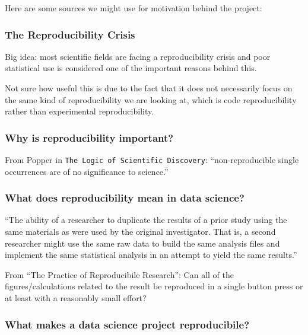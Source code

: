 \documentclass[12pt]{article}
\begin{document}
Here are some sources we might use for motivation behind the project:

\subsubsection{The Reproducibility
Crisis}\label{the-reproducibility-crisis}

Big idea: most scientific fields are facing a reproducibility crisis and
poor statistical use is considered one of the important reasons behind
this.

Not sure how useful this is due to the fact that it does not necessarily
focus on the same kind of reproducibility we are looking at, which is
code reproducibility rather than experimental reproducibility.

\citet{baker20161}

\subsubsection{Why is reproducibility
important?}\label{why-is-reproducibility-important}

From Popper in \texttt{The\ Logic\ of\ Scientific\ Discovery}:
``non-reproducible single occurrences are of no significance to
science.''

\citet{popper2005logic}

\subsubsection{What does reproducibility mean in data
science?}\label{what-does-reproducibility-mean-in-data-science}

``The ability of a researcher to duplicate the results of a prior study
using the same materials as were used by the original investigator. That
is, a second researcher might use the same raw data to build the same
analysis files and implement the same statistical analysis in an attempt
to yield the same results.''

\citet{goodman2016does}

From ``The Practice of Reproducibile Research'': Can all of the
figures/calculations related to the result be reproduced in a single
button press or at least with a reasonably small effort?

\citet{kitzes2017practice}

\subsubsection{What makes a data science project
reproducibile?}\label{what-makes-a-data-science-project-reproducibile}
\end{document}
